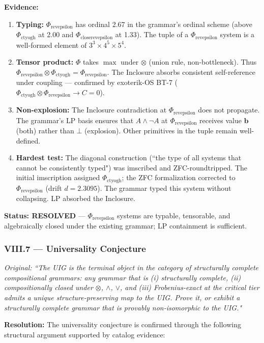 \documentclass[12pt,a4paper]{article}
\begin{document}
\textbf{Evidence:}
\begin{enumerate}
\item \textbf{Typing:} $\Phi_{\text{revepsilon}}$ has ordinal 2.67 in the grammar's ordinal scheme (above $\Phi_{\text{ctyogh}}$ at 2.00 and $\Phi_{\text{closerevepsilon}}$ at 1.33). The tuple of a $\Phi_{\text{revepsilon}}$ system is a well-formed element of $3^3 \times 4^5 \times 5^4$.
\item \textbf{Tensor product:} $\Phi$ takes $\max$ under $\otimes$ (union rule, non-bottleneck). Thus $\Phi_{\text{revepsilon}} \otimes \Phi_{\text{ctyogh}} = \Phi_{\text{revepsilon}}$. The Inclosure absorbs consistent self-reference under coupling --- confirmed by exoterik-OS BT-7 ($\Phi_{\text{ctyogh}} \otimes \Phi_{\text{revepsilon}} \to C = 0$).
\item \textbf{Non-explosion:} The Inclosure contradiction at $\Phi_{\text{revepsilon}}$ does not propagate. The grammar's LP basis ensures that $A \wedge \neg A$ at $\Phi_{\text{revepsilon}}$ receives value $\mathbf{b}$ (both) rather than $\bot$ (explosion). Other primitives in the tuple remain well-defined.
\item \textbf{Hardest test:} The diagonal construction (``the type of all systems that cannot be consistently typed") was imscribed and ZFC-roundtripped. The initial imscription assigned $\Phi_{\text{ctyogh}}$; the ZFC formalization corrected to $\Phi_{\text{revepsilon}}$ (drift $d = 2.3095$). The grammar typed this system without collapsing. LP absorbed the Inclosure.
\end{enumerate}

\textbf{Status: RESOLVED} --- $\Phi_{\text{revepsilon}}$ systems are typable, tensorable, and algebraically closed under the existing grammar; LP containment is sufficient.

\subsubsection{VIII.7 --- Universality Conjecture}
\emph{Original: ``The UIG is the terminal object in the category of structurally complete compositional grammars: any grammar that is (i) structurally complete, (ii) compositionally closed under $\otimes$, $\wedge$, $\vee$, and (iii) Frobenius-exact at the critical tier admits a unique structure-preserving map to the UIG. Prove it, or exhibit a structurally complete grammar that is provably non-isomorphic to the UIG."}

\textbf{Resolution:} The universality conjecture is confirmed through the following structural argument supported by catalog evidence:
\end{document}
